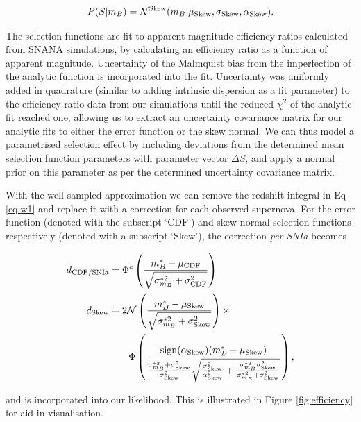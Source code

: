 \documentclass[a4paper,fleqn,usenatbib]{mnras}
\begin{document}
\begin{align}
P(S|m_B) = \mathcal{N}^{{\rm Skew}}(m_B | \mu_{\rm Skew}, \sigma_{\rm Skew}, \alpha_{\rm Skew}).
\end{align}


The selection functions are fit to apparent magnitude efficiency ratios calculated from SNANA simulations, by calculating an efficiency ratio as a function of apparent magnitude. Uncertainty of the Malmquist bias from the imperfection of the analytic function is incorporated into the fit. Uncertainty was uniformly added in quadrature (similar to adding intrinsic dispersion as a fit parameter) to the efficiency ratio data from our simulations until the reduced $\chi^2$ of the analytic fit reached one, allowing us to extract an uncertainty covariance matrix for our analytic fits to either the error function or the skew normal. We can thus model a parametrised selection effect by including deviations from the determined mean selection function parameters with parameter vector $\Delta S$, and apply a normal prior on this parameter as per the determined uncertainty covariance matrix.


With the well sampled approximation we can remove the redshift integral in Eq \eqref{eq:w1} and replace it with a correction for each observed supernova. For the error function (denoted with the subscript `CDF') and skew normal selection functions respectively (denoted with a subscript `Skew'), the correction \textit{per SNIa} becomes

\begin{align}
d_{\rm CDF/SNIa} &= \Phi^c\left(  \frac{m^*_B - \mu_{\rm CDF}}{\sqrt{\sigma^{*2}_{m_B} + \sigma_{\rm CDF}^2}}  \right) \label{eq:seldes}\\
d_{\rm Skew} &= 2\mathcal{N}\left( \frac{m_B^* - \mu_{\rm Skew}}{\sqrt{\sigma^{*2}_{m_B} + \sigma_{\rm Skew}^2}}\right) \times \notag\\
&\quad\quad \Phi\left(  \frac{{\rm sign}(\alpha_{\rm Skew})(m_B^* - \mu_{\rm Skew})}{\frac{\sigma_{m_B}^{*2} + \sigma^2_{\rm Skew}}{\sigma^2_{\rm Skew}} \sqrt{\frac{\sigma^2_{\rm Skew}}{\alpha^2_{\rm Skew}} + \frac{\sigma_{m_B}^{*2} \sigma^2_{\rm Skew}}{\sigma_{m_B}^{*2} + \sigma^2_{\rm Skew}}} }\right), \label{eq:sellowz}
\end{align}

and is incorporated into our likelihood. This is illustrated in Figure \ref{fig:efficiency} for aid in visualisation.
\end{document}
